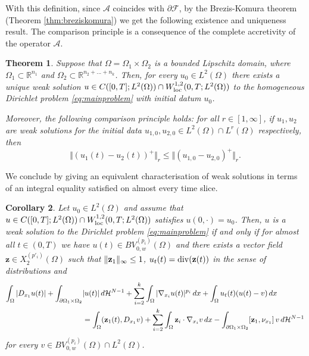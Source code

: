 \documentclass[reqno,12pt]{amsart}
\def\z{{\bf z}}
\newtheorem{theorem}{Theorem}[section]
\newtheorem{corollary}[theorem]{Corollary}
\def\R{\mathbb R}
\numberwithin{equation}{section}
\begin{document}
With this definition, since $\mathcal{A}$ coincides with $\partial\mathcal{F}$, by the Brezis-Komura theorem (Theorem \ref{thm:breziskomura}) we get the following existence and uniqueness result. The comparison principle is a consequence of the complete accretivity of the operator $\mathcal{A}$.

\begin{theorem}
Suppose that $\Omega = \Omega_1 \times \Omega_2$ is a bounded Lipschitz domain, where $\Omega_1 \subset \R^{n_1}$ and $\Omega_2 \subset \R^{n_2 + ... + n_k}$. Then, for every $u_0 \in L^2(\Omega)$ there exists a unique weak solution $u \in C([0,T]; L^2(\Omega)) \cap W_{\rm loc}^{1,2}(0, T; L^2(\Omega))$ to the homogeneous Dirichlet problem \eqref{eq:mainproblem} with initial datum $u_0$. 

Moreover, the following comparison principle holds: for all $r \in [1,\infty]$, if $u_1, u_2$ are weak solutions for the initial data $u_{1,0}, u_{2,0} \in L^2(\Omega) \cap L^r(\Omega)$ respectively, then
\begin{equation}
\Vert (u_1(t) - u_2(t))^+ \Vert_r \leq \Vert ( u_{1,0}- u_{2,0})^+ \Vert_r.
\end{equation}
\end{theorem}

We conclude by giving an equivalent characterisation of weak solutions in terms of an integral equality satisfied on almost every time slice.

\begin{corollary}
Let $u_0 \in L^2(\Omega)$ and assume that $u \in C([0,T]; L^2(\Omega)) \cap W_{\rm loc}^{1,2}(0, T; L^2(\Omega))$ satisfies $u(0, \cdot) =u_0$. Then, $u$ is a weak solution to the Dirichlet problem \eqref{eq:mainproblem} if and only if for almost all $t \in (0,T)$ we have $u(t) \in BV_{0,w}^{(p_i)}(\Omega)$ and there exists a vector field $\mathbf{z} \in X_2^{(p'_i)}(\Omega)$ such that $\| \z_1 \|_\infty \leq 1$, $u_t(t) = \mathrm{div}(\z(t))$ in the sense of distributions and 
\begin{align}\label{eq:equivalentcondition}
\int_\Omega |D_{x_1} u(t)| + \int_{\partial\Omega_1 \times \Omega_2} &|u(t)| \, d\mathcal{H}^{N-1} + \sum_{i = 2}^k \int_{\Omega} |\nabla_{x_i} u(t)|^{p_i} \, dx + \int_{\Omega} u_t(t) (u(t)-v) \, dx \\ 
&= \int_\Omega (\z_1(t), D_{x_1} v) + \sum_{i=2}^k \int_\Omega \z_i \cdot \nabla_{x_i} v \, dx - \int_{\partial\Omega_1 \times \Omega_2} [\z_1, \nu_{x_1}] \, v \, d\mathcal{H}^{N-1}
\end{align}
for every $v \in BV_{0,w}^{(p_i)}(\Omega) \cap L^2(\Omega)$.


\end{corollary}
\end{document}
